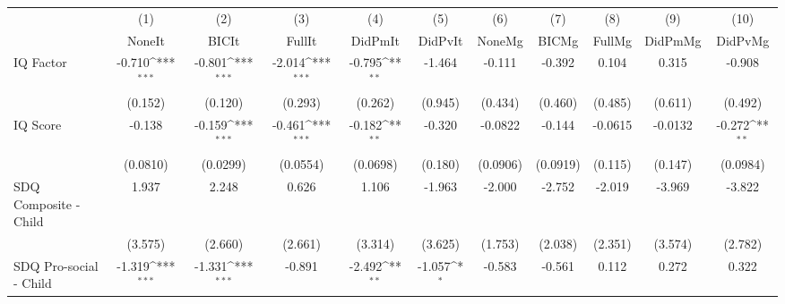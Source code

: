 {
\def\sym#1{\ifmmode^{#1}\else\(^{#1}\)\fi}
\begin{tabular}{l*{10}{c}}
\toprule
            &\multicolumn{1}{c}{(1)}&\multicolumn{1}{c}{(2)}&\multicolumn{1}{c}{(3)}&\multicolumn{1}{c}{(4)}&\multicolumn{1}{c}{(5)}&\multicolumn{1}{c}{(6)}&\multicolumn{1}{c}{(7)}&\multicolumn{1}{c}{(8)}&\multicolumn{1}{c}{(9)}&\multicolumn{1}{c}{(10)}\\
            &\multicolumn{1}{c}{NoneIt}&\multicolumn{1}{c}{BICIt}&\multicolumn{1}{c}{FullIt}&\multicolumn{1}{c}{DidPmIt}&\multicolumn{1}{c}{DidPvIt}&\multicolumn{1}{c}{NoneMg}&\multicolumn{1}{c}{BICMg}&\multicolumn{1}{c}{FullMg}&\multicolumn{1}{c}{DidPmMg}&\multicolumn{1}{c}{DidPvMg}\\
\midrule
IQ Factor   &      -0.710\sym{***}&      -0.801\sym{***}&      -2.014\sym{***}&      -0.795\sym{**} &      -1.464         &      -0.111         &      -0.392         &       0.104         &       0.315         &      -0.908         \\
            &     (0.152)         &     (0.120)         &     (0.293)         &     (0.262)         &     (0.945)         &     (0.434)         &     (0.460)         &     (0.485)         &     (0.611)         &     (0.492)         \\
\addlinespace
IQ Score    &      -0.138         &      -0.159\sym{***}&      -0.461\sym{***}&      -0.182\sym{**} &      -0.320         &     -0.0822         &      -0.144         &     -0.0615         &     -0.0132         &      -0.272\sym{**} \\
            &    (0.0810)         &    (0.0299)         &    (0.0554)         &    (0.0698)         &     (0.180)         &    (0.0906)         &    (0.0919)         &     (0.115)         &     (0.147)         &    (0.0984)         \\
\addlinespace
SDQ Composite - Child&       1.937         &       2.248         &       0.626         &       1.106         &      -1.963         &      -2.000         &      -2.752         &      -2.019         &      -3.969         &      -3.822         \\
            &     (3.575)         &     (2.660)         &     (2.661)         &     (3.314)         &     (3.625)         &     (1.753)         &     (2.038)         &     (2.351)         &     (3.574)         &     (2.782)         \\
\addlinespace
SDQ Pro-social - Child&      -1.319\sym{***}&      -1.331\sym{***}&      -0.891         &      -2.492\sym{**} &      -1.057\sym{*}  &      -0.583         &      -0.561         &       0.112         &       0.272         &       0.322         \\

\end{tabular}}

